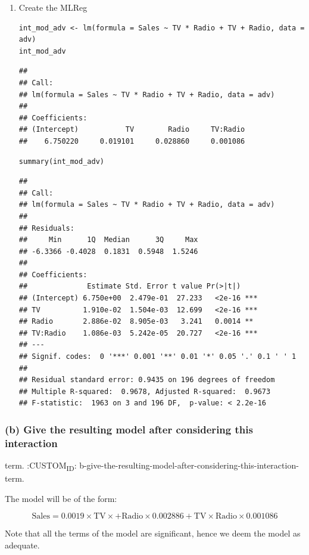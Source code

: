 \documentclass[11pt]{article}
\begin{document}
\begin{enumerate}
\item Create the MLReg
\label{sec:orga31d01d}
\begin{verbatim}
int_mod_adv <- lm(formula = Sales ~ TV * Radio + TV + Radio, data = adv)
int_mod_adv
\end{verbatim}

\begin{verbatim}
## 
## Call:
## lm(formula = Sales ~ TV * Radio + TV + Radio, data = adv)
## 
## Coefficients:
## (Intercept)           TV        Radio     TV:Radio  
##    6.750220     0.019101     0.028860     0.001086
\end{verbatim}

\begin{verbatim}
summary(int_mod_adv)
\end{verbatim}

\begin{verbatim}
## 
## Call:
## lm(formula = Sales ~ TV * Radio + TV + Radio, data = adv)
## 
## Residuals:
##     Min      1Q  Median      3Q     Max 
## -6.3366 -0.4028  0.1831  0.5948  1.5246 
## 
## Coefficients:
##              Estimate Std. Error t value Pr(>|t|)    
## (Intercept) 6.750e+00  2.479e-01  27.233   <2e-16 ***
## TV          1.910e-02  1.504e-03  12.699   <2e-16 ***
## Radio       2.886e-02  8.905e-03   3.241   0.0014 ** 
## TV:Radio    1.086e-03  5.242e-05  20.727   <2e-16 ***
## ---
## Signif. codes:  0 '***' 0.001 '**' 0.01 '*' 0.05 '.' 0.1 ' ' 1
## 
## Residual standard error: 0.9435 on 196 degrees of freedom
## Multiple R-squared:  0.9678, Adjusted R-squared:  0.9673 
## F-statistic:  1963 on 3 and 196 DF,  p-value: < 2.2e-16
\end{verbatim}
\end{enumerate}

\subsubsection{(b) Give the resulting model after considering this interaction}
\label{sec:org46b2268}
term.
:CUSTOM\textsubscript{ID}: b-give-the-resulting-model-after-considering-this-interaction-term.

The model will be of the form:

$$
  \text{Sales} = 0.0019 \times \text{TV} \times + \text{Radio} \times  0.002886 + \text{TV} \times \text{Radio} \times 0.001086
  $$

Note that all the terms of the model are significant, hence we deem the
model as adequate.
\end{document}
